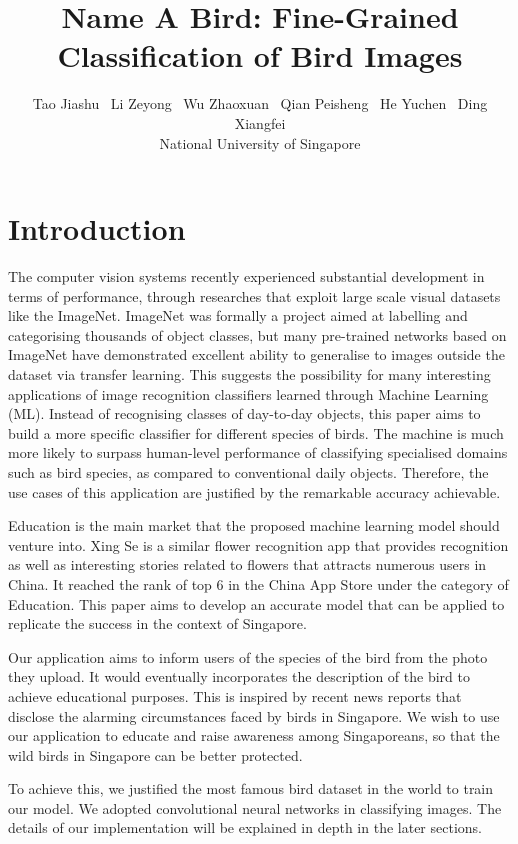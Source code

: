 \documentclass[letterpaper, 12pt]{article}
\title{Name A Bird: Fine-Grained Classification of Bird Images}
\author{Tao Jiashu \ Li Zeyong \  Wu Zhaoxuan \ Qian Peisheng \ He Yuchen \ Ding Xiangfei\\
National University of Singapore}
\date{}
\begin{document}
\maketitle

\section{Introduction}
The computer vision systems recently experienced substantial development in terms of
performance, through researches that exploit large scale visual datasets like the ImageNet.
ImageNet was formally a project aimed at labelling and categorising thousands of object classes,
but many pre-trained networks based on ImageNet have demonstrated excellent ability to generalise
to images outside the dataset via transfer learning. This suggests the possibility for many
interesting applications of image recognition classifiers learned through Machine Learning (ML).
Instead of recognising classes of day-to-day objects, this paper aims to build a more specific
classifier for different species of birds. The machine is much more likely to surpass human-level
performance of classifying specialised domains such as bird species, as compared to conventional
daily objects. Therefore, the use cases of this application are justified by the remarkable
accuracy achievable.

Education is the main market that the proposed machine learning model should venture into.
Xing Se is a similar flower recognition app that provides recognition as well as interesting
stories related to flowers that attracts numerous users in China. It reached the rank of top 6
in the China App Store under the category of Education. This paper aims to develop an accurate
model that can be applied to replicate the success in the context of Singapore.

Our application aims to inform users of the species of the bird from the photo they upload. It would
eventually incorporates the description of the bird to achieve educational purposes. This is inspired
by recent news reports that disclose the alarming circumstances faced by birds in Singapore. We wish
to use our application to educate and raise awareness among Singaporeans, so that the wild birds in
Singapore can be better protected.

To achieve this, we justified the most famous bird dataset in the world to train our model. We adopted
convolutional neural networks in classifying images. The details of our implementation will be
explained in depth in the later sections.
\end{document}
